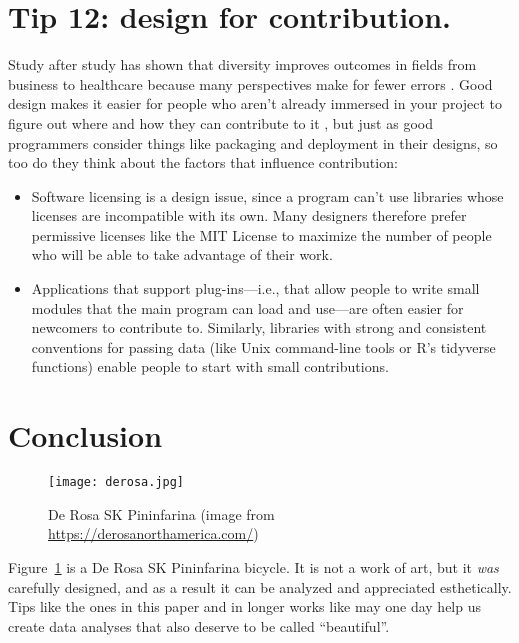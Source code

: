 \documentclass[10pt,letterpaper]{article}
\begin{document}
\section*{Tip 12: design for contribution.}

Study after study has shown that diversity improves outcomes in fields from business to healthcare
because many perspectives make for fewer errors \cite{Gompers2018,Gomez2019}.
Good design makes it easier for people who aren't already immersed in your project
to figure out where and how they can contribute to it \cite{Sholler2019},
but just as good programmers consider things like packaging and deployment in their designs,
so too do they think about the factors that influence contribution:

\begin{itemize}

\item
  Software licensing is a design issue,
  since a program can't use libraries whose licenses are incompatible with its own.
  Many designers therefore prefer permissive licenses like the MIT License
  to maximize the number of people who will be able to take advantage of their work.

\item
  Applications that support plug-ins---i.e.,
  that allow people to write small modules that the main program can load and use---are
  often easier for newcomers to contribute to.
  Similarly,
  libraries with strong and consistent conventions for passing data
  (like Unix command-line tools or R's tidyverse functions)
  enable people to start with small contributions.

\end{itemize}

\section*{Conclusion}

\begin{figure}
  \centering
  \texttt{[image: derosa.jpg]}
  \caption{De Rosa SK Pininfarina (image from \url{https://derosanorthamerica.com/})}
  \label{bicycle}
\end{figure}

Figure~\ref{bicycle} is a De Rosa SK Pininfarina bicycle.
It is not a work of art,
but it \emph{was} carefully designed,
and as a result it can be analyzed and appreciated esthetically.
Tips like the ones in this paper
and in longer works like \cite{Budgen2020}
may one day help us create data analyses that also deserve to be called ``beautiful''.


\end{document}
